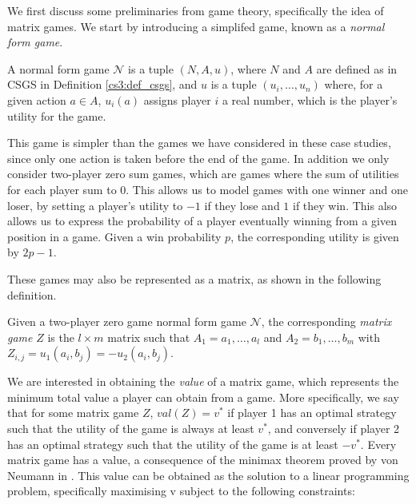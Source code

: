 We first discuss some preliminaries from game theory, specifically the idea of matrix games. We start by introducing a simplifed game, known as a \emph{normal form game}.

\begin{definition}
\label{cs3:normal_form_games}

A normal form game $\mathcal{N}$ is a tuple $(N, A, u)$, where $N$ and $A$ are defined as in CSGS in Definition \ref{cs3:def_csgs}, and $u$ is a tuple $(u_i, \dots, u_n)$ where, for a given action $a \in A$, $u_i(a)$ assigns player $i$ a real number, which is the player's utility for the game.

\end{definition}

This game is simpler than the games we have considered in these case studies, since only one action is taken before the end of the game. In addition we only consider two-player zero sum games, which are games where the sum of utilities for each player sum to 0. This allows us to model games with one winner and one loser, by setting a player's utility to $-1$ if they lose and $1$ if they win. This also allows us to express the probability of a player eventually winning from a given position in a game. Given a win probability $p$, the corresponding utility is given by $2p - 1$.

These games may also be represented as a matrix, as shown in the following definition.

\begin{definition}
    \label{cs3:matrix_games}

    Given a two-player zero game normal form game $\mathcal{N}$, the corresponding \emph{matrix game} $Z$ is the $l \times m$ matrix such that $A_1 = {a_1, \dots, a_l}$ and  $A_2 = {b_1, \dots, b_m}$ with $Z_{i, j} = u_{1}(a_i, b_j) = -u_{2}(a_i, b_j)$.
\end{definition}

We are interested in obtaining the \emph{value} of a matrix game, which represents the minimum total value a player can obtain from a game. More specifically, we say that for some matrix game $Z$, $val(Z) = v^*$ if player 1 has an optimal strategy such that the utility of the game is always at least $v^*$, and conversely if player 2 has an optimal strategy such that the utility of the game is at least $-v^*$. Every matrix game has a value, a consequence of the minimax theorem proved by von Neumann in \cite{v_neumann_zur_1928}. This value can be obtained as the solution to a linear programming problem, specifically maximising v subject to the following constraints:

